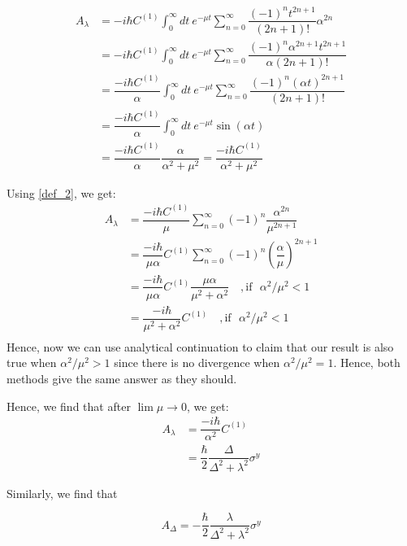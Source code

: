 \documentclass[11pt,a4paper]{article}
\begin{document}
\begin{align*}
A_{\lambda} &= -i \hbar    C^{(1)} \int_0^{\infty} dt\ e^{-\mu t} \sum_{n=0}^{\infty} \dfrac{(-1)^{n} t ^{2n+1}}{(2n+1)!}  \alpha^{2n}  \\
 &= -i \hbar    C^{(1)} \int_0^{\infty} dt\ e^{-\mu t} \sum_{n=0}^{\infty} \dfrac{(-1)^{n}  \alpha^{2n+1} t ^{2n+1}}{\alpha(2n+1)!}   \\
  &= \dfrac{-i \hbar    C^{(1)}}{\alpha} \int_0^{\infty} dt\ e^{-\mu t} \sum_{n=0}^{\infty} \dfrac{(-1)^{n}  (\alpha t)^{2n+1}}{(2n+1)!}   \\
    &= \dfrac{-i \hbar    C^{(1)}}{\alpha} \int_0^{\infty} dt\ e^{-\mu t}  \sin  (\alpha t)   \\
     &= \dfrac{-i \hbar    C^{(1)}}{\alpha} \dfrac{\alpha}{\alpha^2 + \mu^2} =\dfrac{-i \hbar    C^{(1)}}{{\alpha^2 + \mu^2}} 
\end{align*}
 

Using \ref{def_2}, we get: %
\begin{align*}
A_{\lambda} &=  \dfrac{-i \hbar   C^{(1)}}{\mu}\sum_{n=0}^{\infty}   (-1)^{n} \dfrac{ \alpha^{2n}}{\mu^{2n+1}} \\
&=  \dfrac{-i \hbar }{\mu \alpha}  C^{(1)}\sum_{n=0}^{\infty}   (-1)^{n} \left(\dfrac{ \alpha}{\mu} \right)^{2n+1} \\
&=  \dfrac{-i \hbar }{\mu \alpha}  C^{(1)} \dfrac{\mu \alpha}{ \mu^2 + \alpha^2}\quad, \mbox{if ~}\alpha^2 / \mu^2 <1 \\
&=      \dfrac{ -i\hbar  }{ \mu^2 + \alpha^2} C^{(1)} \quad, \mbox{if ~} \alpha^2 / \mu^2 <1 \\
\end{align*}
Hence, now we can use analytical continuation to claim that our result is also true when $\alpha^2 / \mu^2 >1$ since there is no divergence when $\alpha^2 / \mu^2 =1$. Hence, both methods give the same answer as they should.


Hence, we find that  after $\lim \mu \rightarrow 0$, we get:
\begin{align}
 A_{\lambda}& = \dfrac{ -i\hbar  }{ \alpha^2} C^{(1)}\\
&= \dfrac{\hbar}{2}\dfrac{\Delta }{\Delta^2 + \lambda^2} \sigma^y
\end{align}

Similarly, we find that 

\begin{equation}
A_{\Delta}= -\dfrac{\hbar}{2}\dfrac{\lambda }{\Delta^2 + \lambda^2} \sigma^y
\end{equation}
\end{document}
